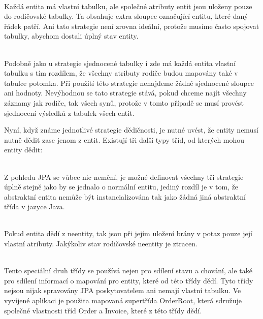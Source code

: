 \documentclass[122pt,oneside]{fithesis}
\begin{document}
\vspace{5 mm}
\\\indent Každá entita má vlastní tabulku, ale společné atributy entit jsou uloženy pouze do rodičovské tabulky. Ta obsahuje extra sloupec označující entitu, které daný řádek patří. Ani tato strategie není zrovna ideální, protože musíme často spojovat tabulky, abychom dostali úplný stav entity.

\vspace{5 mm}
\\\indent Podobně jako u strategie sjednocené tabulky i zde má každá entita vlastní tabulku s tím rozdílem, že všechny atributy rodiče budou mapovány také v tabulce potomka. Při použití této strategie nenajdeme žádné sjednocené sloupce ani hodnoty. Nevýhodnou se tato strategie stává, pokud chceme najít všechny záznamy jak rodiče, tak všech synů, protože v tomto případě se musí provést sjednocení výsledků z tabulek všech entit.

Nyní, když známe jednotlivé strategie dědičnosti, je nutné uvést, že entity nemusí nutně dědit zase jenom z entit. Existují tři další typy tříd, od kterých mohou entity dědit:

\vspace{5 mm}
\\\indent Z pohledu JPA se vůbec nic nemění, je možné definovat všechny tři strategie úplně stejně jako by se jednalo o normální entitu, jediný rozdíl je v tom, že abstraktní entita nemůže být instancializována tak jako žádná jiná abstraktní třída v jazyce Java.

\vspace{5 mm}
\\\indent Pokud entita dědí z neentity, tak jsou při jejím uložení brány v potaz pouze její vlastní atributy. Jakýkoliv stav rodičovské neentity je ztracen.

\vspace{5 mm}
\\\indent Tento speciální druh třídy se používá nejen pro sdílení stavu a chování, ale také pro sdílení informací o mapování pro entity, které od této třídy dědí. Tyto třídy nejsou nijak spravovány JPA poskytovatelem ani nemají vlastní tabulku. Ve vyvíjené aplikaci je použita mapovaná supertřída OrderRoot, která sdružuje společné vlastnosti tříd Order a Invoice, které z této třídy dědí.
\end{document}
